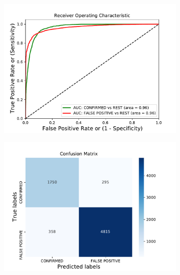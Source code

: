 \begin{figure}[H]
                \centering
                \begin{subfigure}{.49\textwidth}
                \includegraphics[width = 1\textwidth]{data/bLR_vif_cap2_overfit_roc.pdf}
                \end{subfigure}
                \begin{subfigure}{.49\textwidth}
                \includegraphics[width = 1\textwidth]{data/bLR_vif_cap2_overfit_cm.pdf}
                \end{subfigure}
                \begin{subfigure}{.49\textwidth}

\end{subfigure}
\end{figure}
